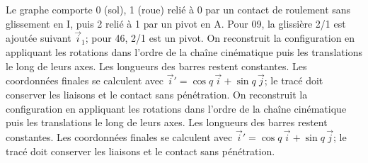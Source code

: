 \begin{corrigebox}
Le graphe comporte 0 (sol), 1 (roue) relié à 0 par
                    un contact de roulement sans glissement en I, puis 2 relié à 1 par un
                    pivot en A. Pour 09, la glissière 2/1 est ajoutée suivant $\vec i_1$;
                    pour 46, 2/1 est un pivot.
On reconstruit la configuration en appliquant les
                rotations dans l'ordre de la chaîne cinématique puis les translations le
                long de leurs axes. Les longueurs des barres restent constantes. Les
                coordonnées finales se calculent avec
                $\vec i'=\cos q\,\vec i+\sin q\,\vec j$; le tracé doit conserver les
                liaisons et le contact sans pénétration.
On reconstruit la configuration en appliquant les
                rotations dans l'ordre de la chaîne cinématique puis les translations le
                long de leurs axes. Les longueurs des barres restent constantes. Les
                coordonnées finales se calculent avec
                $\vec i'=\cos q\,\vec i+\sin q\,\vec j$; le tracé doit conserver les
                liaisons et le contact sans pénétration.
\end{corrigebox}

